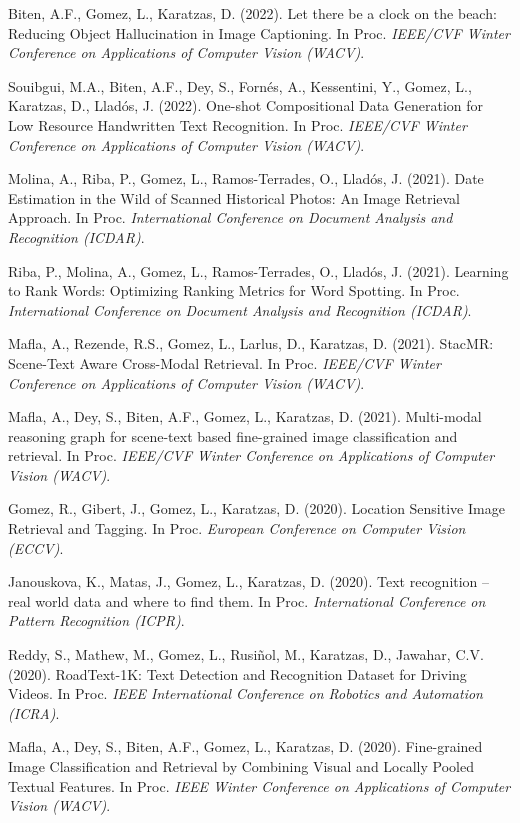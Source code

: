 \documentclass[11pt]{article}
\newcommand{\venue}[1]{\textit{#1}}
\begin{document}
\begin{pubs}
\item Biten, A.F., Gomez, L., Karatzas, D. (2022). Let there be a clock on the beach: Reducing Object Hallucination in Image Captioning. In Proc. \venue{IEEE/CVF Winter Conference on Applications of Computer Vision (WACV)}.
\item Souibgui, M.A., Biten, A.F., Dey, S., Fornés, A., Kessentini, Y., Gomez, L., Karatzas, D., Lladós, J. (2022). One-shot Compositional Data Generation for Low Resource Handwritten Text Recognition. In Proc. \venue{IEEE/CVF Winter Conference on Applications of Computer Vision (WACV)}.
\item Molina, A., Riba, P., Gomez, L., Ramos-Terrades, O., Lladós, J. (2021). Date Estimation in the Wild of Scanned Historical Photos: An Image Retrieval Approach. In Proc. \venue{International Conference on Document Analysis and Recognition (ICDAR)}.
\item Riba, P., Molina, A., Gomez, L., Ramos-Terrades, O., Lladós, J. (2021). Learning to Rank Words: Optimizing Ranking Metrics for Word Spotting. In Proc. \venue{International Conference on Document Analysis and Recognition (ICDAR)}.
\item Mafla, A., Rezende, R.S., Gomez, L., Larlus, D., Karatzas, D. (2021). StacMR: Scene-Text Aware Cross-Modal Retrieval. In Proc. \venue{IEEE/CVF Winter Conference on Applications of Computer Vision (WACV)}.
\item Mafla, A., Dey, S., Biten, A.F., Gomez, L., Karatzas, D. (2021). Multi-modal reasoning graph for scene-text based fine-grained image classification and retrieval. In Proc. \venue{IEEE/CVF Winter Conference on Applications of Computer Vision (WACV)}.
\item Gomez, R., Gibert, J., Gomez, L., Karatzas, D. (2020). Location Sensitive Image Retrieval and Tagging. In Proc. \venue{European Conference on Computer Vision (ECCV)}.
\item Janouskova, K., Matas, J., Gomez, L., Karatzas, D. (2020). Text recognition -- real world data and where to find them. In Proc. \venue{International Conference on Pattern Recognition (ICPR)}.
\item Reddy, S., Mathew, M., Gomez, L., Rusiñol, M., Karatzas, D., Jawahar, C.V. (2020). RoadText-1K: Text Detection and Recognition Dataset for Driving Videos. In Proc. \venue{IEEE International Conference on Robotics and Automation (ICRA)}.
\item Mafla, A., Dey, S., Biten, A.F., Gomez, L., Karatzas, D. (2020). Fine-grained Image Classification and Retrieval by Combining Visual and Locally Pooled Textual Features. In Proc. \venue{IEEE Winter Conference on Applications of Computer Vision (WACV)}.

\end{pubs}
\end{document}
